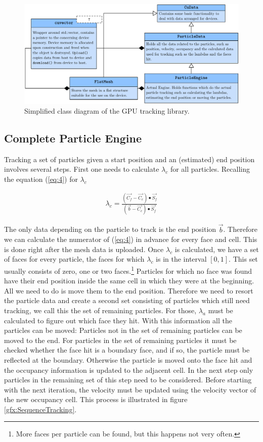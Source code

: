 \begin{figure}[H]
  \centering
  \includegraphics[scale=0.6]{content/gfx/ParticleEngineOverview.pdf}
  \caption{Simplified class diagram of the GPU tracking library.}
  \label{gfx:engineOverview}
\end{figure}

\subsection{Complete Particle Engine}

Tracking a set of particles given a start position and an (estimated) end position involves several steps. First one needs to calculate $\lambda_c$ for all particles. Recalling the equation (\ref{eq:4}) for $\lambda_c$

\begin{eqnarray}
    \lambda_{c} = \frac{(\vec{C_f} - \vec{C_c}) \bullet \vec{S_f}}{(\vec{b} - \vec{C_c}) \bullet \vec{S_f}} \nonumber
\end{eqnarray}

The only data depending on the particle to track is the end position $\vec{b}$. Therefore we can calculate the numerator of (\ref{eq:4}) in advance for every face and cell. This is done right after the mesh data is uploaded. Once $\lambda_c$ is calculated, we have a set of faces for every particle, the faces for which $\lambda_c$ is in the interval $[0,1]$. This set usually consists of zero, one or two faces.\footnote{More faces per particle can be found, but this happens not very often.} Particles for which no face was found have their end position inside the same cell in which they were at the beginning. All we need to do is move them to the end position. Therefore we need to resort the particle data and create a second set consisting of particles which still need tracking, we call this the set of remaining particles. For those, $\lambda_a$ must be calculated to figure out which face they hit. With this information all the particles can be moved: Particles not in the set of remaining particles can be moved to the end. For particles in the set of remaining particles it must be checked whether the face hit is a boundary face, and if so, the particle must be reflected at the boundary. Otherwise the particle is moved onto the face hit and the occupancy information is updated to the adjacent cell. In the next step only particles in the remaining set of this step need to be considered. Before starting with the next iteration, the velocity must be updated using the velocity vector of the new occupancy cell. This process is illustrated in figure \ref{gfx:SequenceTracking}.

